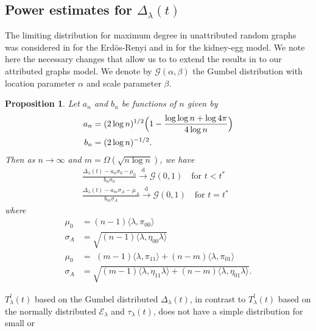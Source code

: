 \documentclass[10pt,journal,compsoc]{IEEEtran}
\newtheorem{proposition}[theorem]{Proposition}
\theoremstyle{definition}
\begin{document}
\subsection{Power estimates for $\Delta_{\lambda}(t)$}
\label{sec:power-estim-delt}
The limiting distribution for maximum degree in unattributed random
graphs was considered in \cite{bollobas85:_random_graph} for the
Erd\"{o}s-Renyi and in \cite{rukhin11} for the kidney-egg model. We
note here the necessary changes that allow us to to extend the results
in \cite{bollobas85:_random_graph,rukhin11} to our attributed graphs
model. We denote by $\mathcal{G}(\alpha,\beta)$ the Gumbel
distribution with location parameter $\alpha$ and scale parameter
$\beta$.
\begin{proposition}
  \label{prop:3}
  Let $a_n$ and $b_n$ be functions of $n$ given by
  \begin{align*}
    a_n &= (2 \log{n})^{1/2}\Bigl(1 - \frac{\log{\log{n}} + \log{4\pi}}{4 \log{n}} \Bigr) \\ 
    b_n &= (2 \log{n})^{-1/2}.
  \end{align*}
  Then as $n \rightarrow \infty$ and $m = \Omega( \sqrt{n \log{n}})$,
  we have
  \begin{gather}
    \label{eq:14}
    \frac{\Delta_{\lambda}(t) - a_{n} \sigma_0 - \mu_0}{b_n \sigma_0}
   \overset{\mathrm{d}}{\longrightarrow}  \mathcal{G}(0,1) \quad \text{for $t < t^{*}$ } \\
    \frac{\Delta_{\lambda}(t) - a_{m} \sigma_A - \mu_A}{b_m \sigma_A}
       \overset{\mathrm{d}}{\longrightarrow}\mathcal{G}(0,1) \quad \text{for $t = t^{*}$ }
  \end{gather}
  where
  \begin{align*}
    \mu_0 &= (n-1)\langle \lambda, \pi_{00} \rangle \\
    \sigma_A &= \sqrt{(n-1)\langle \lambda, \eta_{00} \lambda \rangle} \\
    \mu_0 &= \,\, (m - 1) \langle \lambda, \pi_{11} \rangle + (n-
    m)\langle \lambda, \pi_{01} \rangle
    \\ \sigma_A &= \sqrt{ (m - 1) \langle \lambda, \eta_{11} \lambda \rangle + (n -
      m) \langle \lambda, \eta_{01} \lambda \rangle}.
    \end{align*}
\end{proposition}
$T_{\lambda}^{l}(t)$ based on the Gumbel distributed
$\Delta_{\lambda}(t)$, in contrast to $T_{\lambda}^{l}(t)$ based on
the normally distributed $\mathcal{E}_{\lambda}$ and
$\tau_{\lambda}(t)$, does not have a simple distribution for small or
\end{document}
